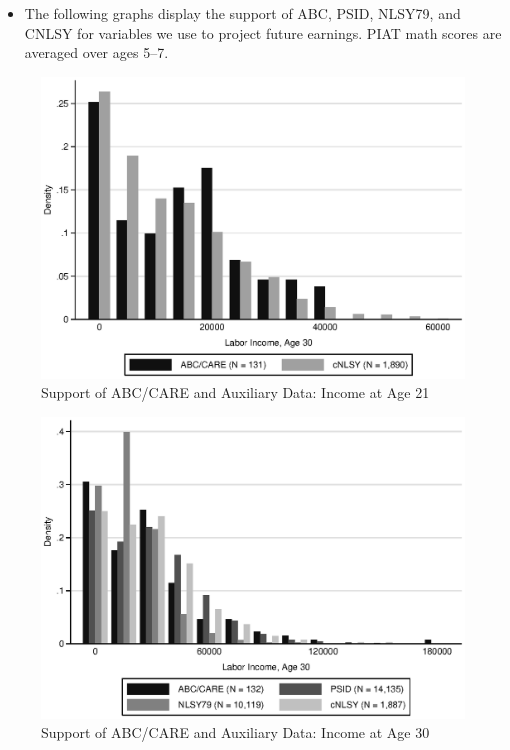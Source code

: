 \documentclass[static]{JJH-Beamer}
\begin{document}

\begin{itemize}
\item The following graphs display the support of ABC, PSID, NLSY79, and CNLSY for variables we use to project future earnings. PIAT math scores are averaged over ages 5--7.
\end{itemize}

\begin{frame}
 \addtocounter{framenumber}{-1}

\begin{figure}[H]
\caption{Support of ABC/CARE and Auxiliary Data: Income at Age 21} \label{fig:support}
\begin{center}
\includegraphics[width=.75\textwidth]{AppOutput/Methodology/support_inc21.eps}
\end{center}
\end{figure}

\end{frame}

\begin{frame}
 \addtocounter{framenumber}{-1}

\begin{figure}[H]\addtocounter{figure}{-1}
\caption{Support of ABC/CARE and Auxiliary Data: Income at Age 30} \label{fig:support}
\begin{center}
\includegraphics[width=.75\textwidth]{AppOutput/Methodology/support_inc30.eps}
\end{center}
\end{figure}

\end{frame}
\end{document}

